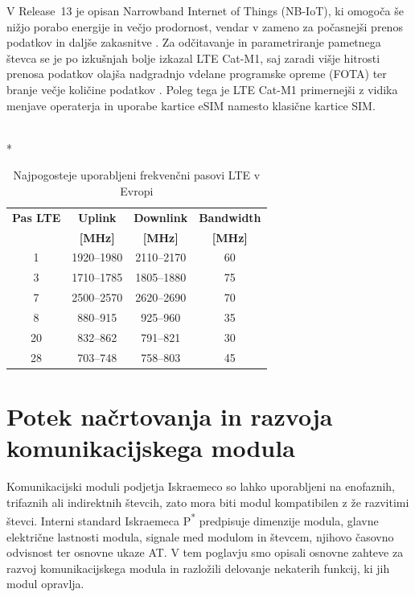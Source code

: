 \documentclass[a4paper,twoside,openright,12pt,slovene]{book}
\begin{document}
    V Release~13 je opisan Narrowband Internet of Things (NB-IoT), ki omogoča še nižjo porabo energije in večjo prodornost, vendar v zameno za počasnejši prenos podatkov in daljše zakasnitve \cite{NBIoT}. Za odčitavanje in parametriranje pametnega števca se je po izkušnjah bolje izkazal LTE Cat-M1, saj zaradi višje hitrosti prenosa podatkov olajša nadgradnjo vdelane programske opreme (FOTA) ter branje večje količine podatkov \cite{Trendi_komunikacijskih_tehnologij}. Poleg tega je LTE Cat-M1 primernejši z vidika menjave operaterja in uporabe kartice eSIM namesto klasične kartice SIM.
\begin{footnotesize}
\begin{table}[h]
    \centering
    \caption{\label{tab:lte_bands} Najpogosteje uporabljeni frekvenčni pasovi LTE v Evropi}
    ~\\*
    \begin{tabular}{cccc} \hline
        \rule{0pt}{3ex}
        \textbf{Pas LTE} &
        \textbf{Uplink} &
        \textbf{Downlink} &
        \textbf{Bandwidth} \\
        \textbf{} &
        \textbf{[MHz]} &
        \textbf{[MHz]} &
        \textbf{[MHz]} \\[0.5ex]
        \hline
        1  & 1920--1980 & 2110--2170 & 60 \\
        3  & 1710--1785 & 1805--1880 & 75 \\
        7  & 2500--2570 & 2620--2690 & 70 \\
        8  & 880--915   & 925--960   & 35 \\
        20 & 832--862   & 791--821   & 30 \\
        28 & 703--748   & 758--803   & 45 \\ \hline
    \end{tabular}
\end{table}
\end{footnotesize}
    
\chapter{Potek načrtovanja in razvoja komunikacijskega modula} \label{Potek načrtovanja in razvoja komunikacijskega modula}
Komunikacijski moduli podjetja Iskraemeco so lahko uporabljeni na enofaznih, trifaznih ali indirektnih števcih, zato mora biti modul kompatibilen z že razvitimi števci. Interni standard Iskraemeca P\textsuperscript{*} predpisuje dimenzije modula, glavne električne lastnosti modula, signale med modulom in števcem, njihovo časovno odvisnost ter osnovne ukaze AT. V tem poglavju smo opisali osnovne zahteve za razvoj komunikacijskega modula in razložili delovanje nekaterih funkcij, ki jih modul opravlja.
\end{document}
